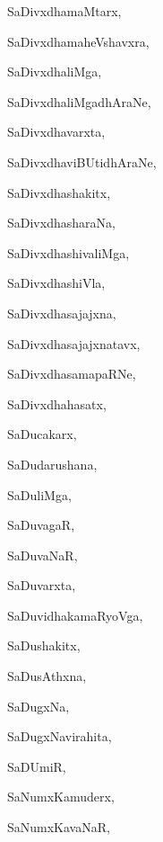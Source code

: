 \begin{multicols}{3}
{\noindent
{SaDivxdhamaMtarx}, \pageref{SaDivxdhamaMtarx}

\noindent
{SaDivxdhamaheVshavxra}, \pageref{SaDivxdhamaheVshavxra}

\noindent
{SaDivxdhaliMga}, \pageref{SaDivxdhaliMga}

\noindent
{SaDivxdhaliMgadhAraNe}, \pageref{SaDivxdhaliMgadhAraNe}

\noindent
{SaDivxdhavarxta}, \pageref{SaDivxdhavarxta}

\noindent
{SaDivxdhaviBUtidhAraNe}, \pageref{SaDivxdhaviBUtidhAraNe}

\noindent
{SaDivxdhashakitx}, \pageref{SaDivxdhashakitx}

\noindent
{SaDivxdhasharaNa}, \pageref{SaDivxdhasharaNa}

\noindent
{SaDivxdhashivaliMga}, \pageref{SaDivxdhashivaliMga}

\noindent
{SaDivxdhashiVla}, \pageref{SaDivxdhashiVla}

\noindent
{SaDivxdhasajajxna}, \pageref{SaDivxdhasajajxna}

\noindent
{SaDivxdhasajajxnatavx}, \pageref{SaDivxdhasajajxnatavx}

\noindent
{SaDivxdhasamapaRNe}, \pageref{SaDivxdhasamapaRNe}

\noindent
{SaDivxdhahasatx}, \pageref{SaDivxdhahasatx}

\noindent
{SaDucakarx}, \pageref{SaDucakarx}

\noindent
{SaDudarushana}, \pageref{SaDudarushana}

\noindent
{SaDuliMga}, \pageref{SaDuliMga}

\noindent
{SaDuvagaR}, \pageref{SaDuvagaR}

\noindent
{SaDuvaNaR}, \pageref{SaDuvaNaR}

\noindent
{SaDuvarxta}, \pageref{SaDuvarxta}

\noindent
{SaDuvidhakamaRyoVga}, \pageref{SaDuvidhakamaRyoVga}

\noindent
{SaDushakitx}, \pageref{SaDushakitx}

\noindent
{SaDusAthxna}, \pageref{SaDusAthxna}

\noindent
{SaDugxNa}, \pageref{SaDugxNa}

\noindent
{SaDugxNavirahita}, \pageref{SaDugxNavirahita}

\noindent
{SaDUmiR}, \pageref{SaDUmiR}

\noindent
{SaNumxKamuderx}, \pageref{SaNumxKamuderx}

\noindent
{SaNumxKavaNaR}, \pageref{SaNumxKavaNaR}

}
\end{multicols}
